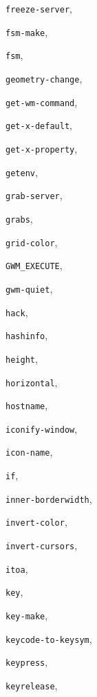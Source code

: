 \begin{theindex}
\item {\tt freeze-server}, {\bf\pageref{freeze-server}}
\item {\tt fsm-make}, {\bf\pageref{fsm-make}}
\item {\tt fsm}, {\bf\pageref{fsm}}
\item {\tt geometry-change}, {\bf\pageref{geometry-change}}
\item {\tt get-wm-command}, {\bf\pageref{get-wm-command}}
\item {\tt get-x-default}, {\bf\pageref{get-x-default}}
\item {\tt get-x-property}, {\bf\pageref{get-x-property}}
\item {\tt getenv}, {\bf\pageref{getenv}}
\item {\tt grab-server}, {\bf\pageref{grab-server}}
\item {\tt grabs}, {\bf\pageref{grabs}}
\item {\tt grid-color}, {\bf\pageref{grid-color}}
\item {\tt GWM\_EXECUTE}, {\bf\pageref{GWM_EXECUTE}}
\item {\tt gwm-quiet}, {\bf\pageref{gwm-quiet}}
\item {\tt hack}, {\bf\pageref{hack}}
\item {\tt hashinfo}, {\bf\pageref{hashinfo}}
\item {\tt height}, {\bf\pageref{height}}
\item {\tt horizontal}, {\bf\pageref{horizontal}}
\item {\tt hostname}, {\bf\pageref{hostname}}
\item {\tt iconify-window}, {\bf\pageref{iconify-window}}
\item {\tt icon-name}, {\bf\pageref{icon-name}}
\item {\tt if}, {\bf\pageref{if}}
\item {\tt inner-borderwidth}, {\bf\pageref{inner-borderwidth}}
\item {\tt invert-color}, {\bf\pageref{invert-color}}
\item {\tt invert-cursors}, {\bf\pageref{invert-cursors}}
\item {\tt itoa}, {\bf\pageref{itoa}}
\item {\tt key}, {\bf\pageref{key}}
\item {\tt key-make}, {\bf\pageref{key-make}}
\item {\tt keycode-to-keysym}, {\bf\pageref{keycode-to-keysym}}
\item {\tt keypress}, {\bf\pageref{keypress}}
\item {\tt keyrelease}, {\bf\pageref{keyrelease}}

\end{theindex}
